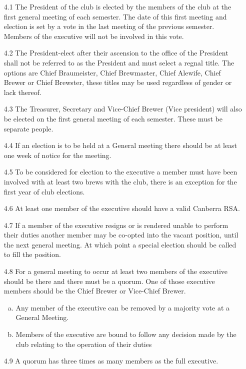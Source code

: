 \documentclass{article}
\begin{document}
\begin{enumerate}
    \item[4.1] The President of the club is elected by the members of the club at the first general meeting of each semester. The date of this first meeting and election is set by a vote in the last meeting of the previous semester. Members of the executive will not be involved in this vote.
    \item[4.2] The President-elect after their ascension to the office of the President shall not be referred to as the President and must select a regnal title. The options are Chief Braumeister, Chief Brewmaster, Chief Alewife, Chief Brewer or Chief Brewster, these titles may be used regardless of gender or lack thereof.
    \item[4.3] The Treasurer, Secretary and Vice-Chief Brewer (Vice president) will also be elected on the first general meeting of each semester. These must be separate people.
    \item[4.4] If an election is to be held at a General meeting there should be at least one week of notice for the meeting.
    \item[4.5] To be considered for election to the executive a member must have been involved with at least two brews with the club, there is an exception for the first year of club elections.
    \item[4.6] At least one member of the executive should have a valid Canberra RSA.
    \item[4.7] If a member of the executive resigns or is rendered unable to perform their duties another member may be co-opted into the vacant position, until the next general meeting. At which point a special election should be called to fill the position.
    \item[4.8] For a general meeting to occur at least two members of the executive should be there and there must be a quorum. One of those executive members should be the Chief Brewer or Vice-Chief Brewer.
    \begin{enumerate}[a.]
        \item Any member of the executive can be removed by a majority vote at a General Meeting.
        \item Members of the executive are bound to follow any decision made by the club relating to the operation of their duties
    \end{enumerate}
    \item[4.9] A quorum has three times as many members as the full executive.
\end{enumerate}
\end{document}

